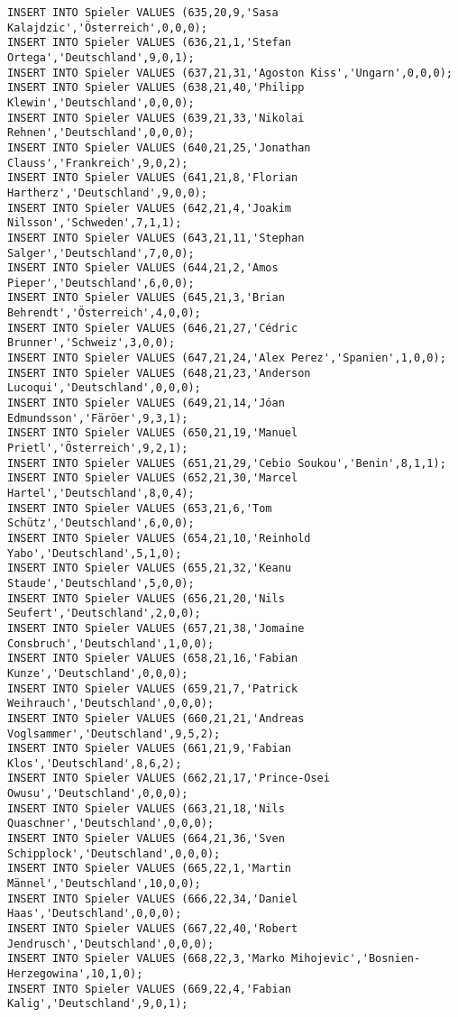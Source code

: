 \documentclass{bschlangaul-aufgabe}
\begin{document}
\begin{verbatim}
INSERT INTO Spieler VALUES (635,20,9,'Sasa Kalajdzic','Österreich',0,0,0);
INSERT INTO Spieler VALUES (636,21,1,'Stefan Ortega','Deutschland',9,0,1);
INSERT INTO Spieler VALUES (637,21,31,'Agoston Kiss','Ungarn',0,0,0);
INSERT INTO Spieler VALUES (638,21,40,'Philipp Klewin','Deutschland',0,0,0);
INSERT INTO Spieler VALUES (639,21,33,'Nikolai Rehnen','Deutschland',0,0,0);
INSERT INTO Spieler VALUES (640,21,25,'Jonathan Clauss','Frankreich',9,0,2);
INSERT INTO Spieler VALUES (641,21,8,'Florian Hartherz','Deutschland',9,0,0);
INSERT INTO Spieler VALUES (642,21,4,'Joakim Nilsson','Schweden',7,1,1);
INSERT INTO Spieler VALUES (643,21,11,'Stephan Salger','Deutschland',7,0,0);
INSERT INTO Spieler VALUES (644,21,2,'Amos Pieper','Deutschland',6,0,0);
INSERT INTO Spieler VALUES (645,21,3,'Brian Behrendt','Österreich',4,0,0);
INSERT INTO Spieler VALUES (646,21,27,'Cédric Brunner','Schweiz',3,0,0);
INSERT INTO Spieler VALUES (647,21,24,'Alex Perez','Spanien',1,0,0);
INSERT INTO Spieler VALUES (648,21,23,'Anderson Lucoqui','Deutschland',0,0,0);
INSERT INTO Spieler VALUES (649,21,14,'Jóan Edmundsson','Färöer',9,3,1);
INSERT INTO Spieler VALUES (650,21,19,'Manuel Prietl','Österreich',9,2,1);
INSERT INTO Spieler VALUES (651,21,29,'Cebio Soukou','Benin',8,1,1);
INSERT INTO Spieler VALUES (652,21,30,'Marcel Hartel','Deutschland',8,0,4);
INSERT INTO Spieler VALUES (653,21,6,'Tom Schütz','Deutschland',6,0,0);
INSERT INTO Spieler VALUES (654,21,10,'Reinhold Yabo','Deutschland',5,1,0);
INSERT INTO Spieler VALUES (655,21,32,'Keanu Staude','Deutschland',5,0,0);
INSERT INTO Spieler VALUES (656,21,20,'Nils Seufert','Deutschland',2,0,0);
INSERT INTO Spieler VALUES (657,21,38,'Jomaine Consbruch','Deutschland',1,0,0);
INSERT INTO Spieler VALUES (658,21,16,'Fabian Kunze','Deutschland',0,0,0);
INSERT INTO Spieler VALUES (659,21,7,'Patrick Weihrauch','Deutschland',0,0,0);
INSERT INTO Spieler VALUES (660,21,21,'Andreas Voglsammer','Deutschland',9,5,2);
INSERT INTO Spieler VALUES (661,21,9,'Fabian Klos','Deutschland',8,6,2);
INSERT INTO Spieler VALUES (662,21,17,'Prince-Osei Owusu','Deutschland',0,0,0);
INSERT INTO Spieler VALUES (663,21,18,'Nils Quaschner','Deutschland',0,0,0);
INSERT INTO Spieler VALUES (664,21,36,'Sven Schipplock','Deutschland',0,0,0);
INSERT INTO Spieler VALUES (665,22,1,'Martin Männel','Deutschland',10,0,0);
INSERT INTO Spieler VALUES (666,22,34,'Daniel Haas','Deutschland',0,0,0);
INSERT INTO Spieler VALUES (667,22,40,'Robert Jendrusch','Deutschland',0,0,0);
INSERT INTO Spieler VALUES (668,22,3,'Marko Mihojevic','Bosnien-Herzegowina',10,1,0);
INSERT INTO Spieler VALUES (669,22,4,'Fabian Kalig','Deutschland',9,0,1);

\end{verbatim}
\end{document}
